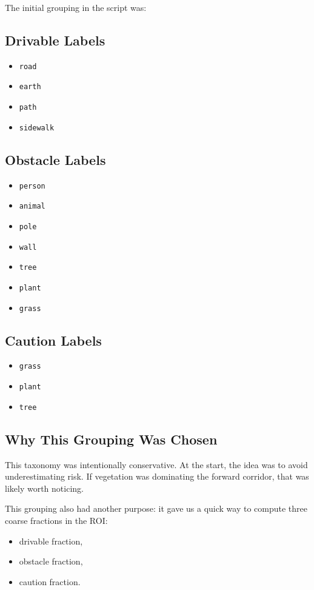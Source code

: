 \documentclass[11pt]{article}
\begin{document}
The initial grouping in the script was:

\subsection{Drivable Labels}
\begin{itemize}[leftmargin=*]
\item \texttt{road}
\item \texttt{earth}
\item \texttt{path}
\item \texttt{sidewalk}
\end{itemize}

\subsection{Obstacle Labels}
\begin{itemize}[leftmargin=*]
\item \texttt{person}
\item \texttt{animal}
\item \texttt{pole}
\item \texttt{wall}
\item \texttt{tree}
\item \texttt{plant}
\item \texttt{grass}
\end{itemize}

\subsection{Caution Labels}
\begin{itemize}[leftmargin=*]
\item \texttt{grass}
\item \texttt{plant}
\item \texttt{tree}
\end{itemize}

\subsection{Why This Grouping Was Chosen}
This taxonomy was intentionally conservative. At the start, the idea was to avoid underestimating risk. If vegetation was dominating the forward corridor, that was likely worth noticing.

This grouping also had another purpose: it gave us a quick way to compute three coarse fractions in the ROI:
\begin{itemize}[leftmargin=*]
\item drivable fraction,
\item obstacle fraction,
\item caution fraction.
\end{itemize}
\end{document}

